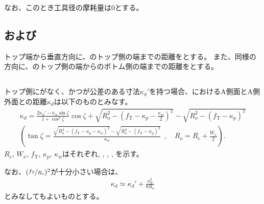 なお、このとき工具径の摩耗量は0とする。


\subsection{\KeywayPos および\KeywayWidth}
トップ端から垂直方向に、\Keyway のトップ側の端までの距離を\KeywayPos とする。
また、同様の方向に、\Keyway のトップ側の端から\Keyway のボトム側の端までの距離を\KeywayWidth とする。


\subsection{\KeywayDepth}
トップ側に\Outcut がなく、かつ\AsideKeywayDepth が公差のある寸法$\kappa_d'$を持つ場合、\KeywayCenter における\Keyway A側面とA側外面との距離$\kappa_d$は以下のものとみなす。
\begin{gather*}
  \kappa_d
  = \frac{2\kappa_d'-\kappa_w\sin\zeta}{1+\cos^2\zeta}\cos\zeta
    +\sqrt{R_\mathrm o^2-\left(f_\mathrm T-\kappa_p-\frac{\kappa_w}2\right)^2}
    -\sqrt{R_\mathrm o^2-\left(f_\mathrm T-\kappa_p\right)^2}\\[3pt]
  \left(
  \tan\zeta
  = \frac{\sqrt{R_\mathrm o^2-\left(f_\mathrm T-\kappa_p-\kappa_w\right)^2}
          -\sqrt{R_\mathrm o^2-\left(f_\mathrm T-\kappa_p\right)^2}}
         {\kappa_w}
    ~~, \quad
    R_\mathrm o = R_\mathrm c+\frac{W_x}2
  \right).
\end{gather*}
$R_\mathrm c$, $W_x$, $f_\mathrm T$, $\kappa_p$, $\kappa_w$はそれぞれ\CenterCurvatureRadius, \OuterDiameter, \TopAlocationLength, \KeywayPos, \KeywayWidth を示す。

なお、$(\nicefrac{f_\mathrm T}{R_\mathrm c})^2$が十分小さい場合は、
\begin{align*}
  \kappa_d \simeq \kappa_d'+\frac{\kappa_w^2}{8R_\mathrm o}
\end{align*}
とみなしてもよいものとする。



\clearpage


